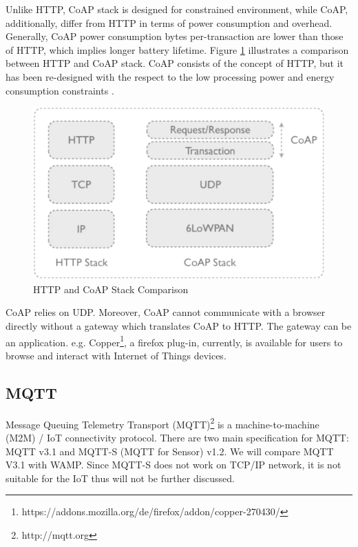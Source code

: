 Unlike HTTP, CoAP stack is designed for constrained environment, while CoAP, additionally, differ from HTTP in terms of power consumption and overhead. Generally, CoAP power consumption bytes per-transaction are lower than those of HTTP, which implies longer battery lifetime. Figure \ref{fig:http-and-coap-stack} illustrates a comparison between HTTP and CoAP stack. CoAP consists of the concept of HTTP, but it has been re-designed with the respect to the low processing power and energy consumption constraints \cite{colitti2011integrating}.

\begin{figure}[ht]
  \begin{center}
    \includegraphics[width=1\textwidth]{images/http-and-coap-stack.pdf}
    \caption{HTTP and CoAP Stack Comparison}
    \label{fig:http-and-coap-stack}
  \end{center}
\end{figure}

CoAP relies on UDP. Moreover, CoAP cannot communicate with a browser directly without a gateway which translates CoAP to HTTP. The gateway can be an application. e.g. Copper\footnote{https://addons.mozilla.org/de/firefox/addon/copper-270430/}, a firefox plug-in, currently, is available for users to browse and interact with Internet of Things devices.

\subsection{MQTT}
Message Queuing Telemetry Transport (MQTT)\footnote{http://mqtt.org} is a machine-to-machine (M2M) / IoT connectivity protocol. There are two main specification for MQTT: MQTT v3.1 and MQTT-S (MQTT for Sensor) v1.2. We will compare MQTT V3.1 with WAMP. Since MQTT-S does not work on TCP/IP network, it is not suitable for the IoT thus will not be further discussed.

